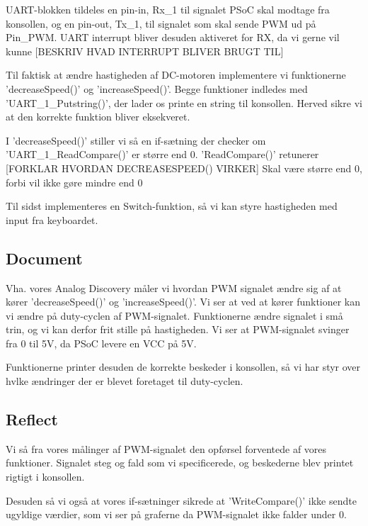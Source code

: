 \documentclass[../main.tex]{subfiles}
\begin{document}
UART-blokken tildeles en pin-in, Rx\_1 til signalet PSoC skal modtage fra konsollen, og en pin-out, Tx\_1, til signalet som skal sende PWM ud på Pin\_PWM. UART interrupt bliver desuden aktiveret for RX, da vi gerne vil kunne [BESKRIV HVAD INTERRUPT BLIVER BRUGT TIL]

Til faktisk at ændre hastigheden af DC-motoren implementere vi funktionerne ’decreaseSpeed()’ og ’increaseSpeed()’. Begge funktioner indledes med ’UART\_1\_Putstring()’, der lader os printe en string til konsollen. Herved sikre vi at den korrekte funktion bliver eksekveret. 


I ’decreaseSpeed()’ stiller vi så en if-sætning der checker om ’UART\_1\_ReadCompare()’ er større end 0. ’ReadCompare()’ retunerer [FORKLAR HVORDAN DECREASESPEED() VIRKER]
Skal være større end 0, forbi vil ikke gøre mindre end 0

Til sidst implementeres en Switch-funktion, så vi kan styre hastigheden med input fra keyboardet.

\subsection{Document}
Vha. vores Analog Discovery måler vi hvordan PWM signalet ændre sig af at kører ’decreaseSpeed()’ og ’increaseSpeed()’.
Vi ser at ved at kører funktioner kan vi ændre på duty-cyclen af PWM-signalet. Funktionerne ændre signalet i små trin, og vi kan derfor frit stille på hastigheden. Vi ser at PWM-signalet svinger fra 0 til 5V, da PSoC levere en VCC på 5V.

Funktionerne printer desuden de korrekte beskeder i konsollen, så vi har styr over hvlke ændringer der er blevet foretaget til duty-cyclen.

\subsection{Reflect}    
Vi så fra vores målinger af PWM-signalet den opførsel forventede af vores funktioner. Signalet steg og fald som vi specificerede, og beskederne blev printet rigtigt i konsollen.

Desuden så vi også at vores if-sætninger sikrede at ’WriteCompare()’ ikke sendte ugyldige værdier, som vi ser på graferne da PWM-signalet ikke falder under 0.
\end{document}
